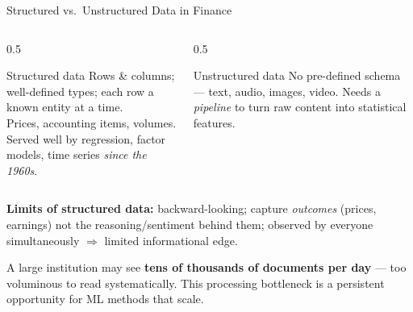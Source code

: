 \documentclass[9pt,t]{beamer}
\begin{document}
\begin{frame}{Structured vs.\ Unstructured Data in Finance}

\begin{columns}[T]
\begin{column}{0.5\textwidth}
\begin{block}{Structured data}
Rows \& columns; well-defined types; each row a known entity at a time.\\[2pt]
Prices, accounting items, volumes. Served well by regression, factor models,
time series \emph{since the 1960s}.
\end{block}
\end{column}
\begin{column}{0.5\textwidth}
\begin{block}{Unstructured data}
No pre-defined schema --- text, audio, images, video. Needs a \emph{pipeline}
to turn raw content into statistical features.
\end{block}
\end{column}
\end{columns}

\medskip
\textbf{Limits of structured data:} backward-looking; capture \emph{outcomes}
(prices, earnings) not the reasoning/sentiment behind them; observed by everyone
simultaneously $\Rightarrow$ limited informational edge.

\medskip
\begin{bigpicture}
A large institution may see \textbf{tens of thousands of documents per day} ---
too voluminous to read systematically. This \alert{processing bottleneck} is a
persistent opportunity for ML methods that scale.
\end{bigpicture}
\end{frame}
\end{document}
